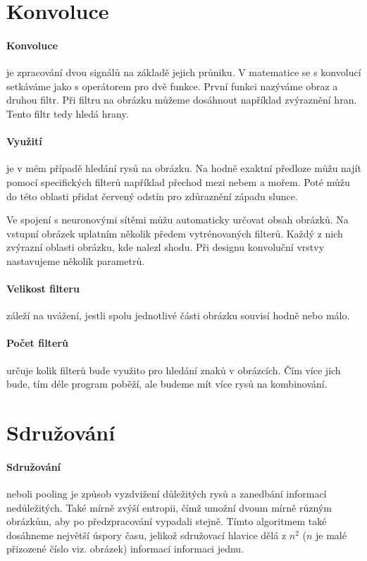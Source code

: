 \documentclass[12pt,a4paper]{report}
\begin{document}
\section{Konvoluce}
\paragraph{Konvoluce}
je zpracování dvou signálů na základě jejich průniku. V matematice se s konvolucí setkáváme jako s operátorem pro dvě funkce. První funkci nazýváme obraz a druhou filtr. Při filtru na obrázku můžeme dosáhnout například zvýraznění hran. Tento filtr tedy hledá hrany.
\paragraph{Využití}
je v mém případě hledání rysů na obrázku. Na hodně exaktní předloze můžu najít pomocí specifických filterů například přechod mezi nebem a mořem. Poté můžu do této oblasti přidat červený odstín pro zdůraznění západu slunce.

Ve spojení s neuronovými sítěmi můžu automaticky určovat obsah obrázků. Na vstupní obrázek uplatním několik předem vytrénovaných filterů. Každý z nich zvýrazní oblasti obrázku, kde nalezl shodu. Při designu konvoluční vrstvy nastavujeme několik parametrů.

\paragraph{Velikost filteru}
záleží na uvážení, jestli spolu jednotlivé části obrázku souvisí hodně nebo málo.
\paragraph{Počet filterů}
určuje kolik filterů bude využito pro hledání znaků v obrázcích. Čím více jich bude, tím déle program poběží, ale budeme mít více rysů na kombinování.
\section{Sdružování}
\paragraph{Sdružování}
neboli pooling je způsob vyzdvižení důležitých rysů a zanedbání informací nedůležitých. Také mírně zvýší entropii, čímž umožní dvoum mírně různým obrázkům, aby po předzpracování vypadali stejně. Tímto algoritmem také dosáhneme největší úspory času, jelikož sdružovací hlavice dělá z $n^2$ ($n$ je malé přizozené číslo viz. obrázek) informací informaci jednu.
\end{document}
